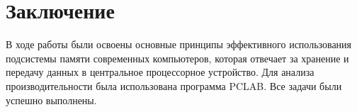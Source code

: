 \chapter{Заключение}

В ходе работы были освоены основные принципы эффективного использования подсистемы памяти современных компьютеров, которая отвечает за хранение и передачу данных в центральное процессорное устройство. Для анализа производительности была использована программа PCLAB. Все задачи были успешно выполнены.